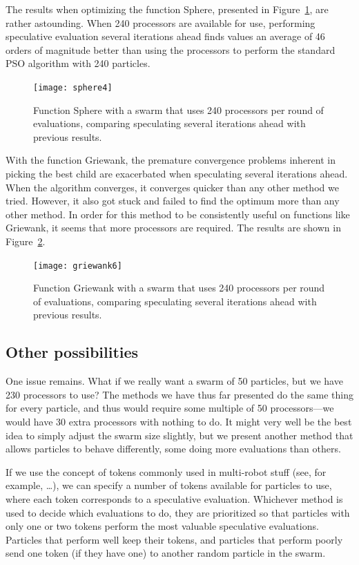\documentclass[journal,letterpaper]{IEEEtran}
\newcommand{\fig}[1]{Figure~\ref{fig:#1}}
\begin{document}
The results when optimizing the function Sphere, presented in
\fig{sphere-manyiters}, are rather astounding.  When 240 processors are
available for use, performing speculative evaluation several iterations ahead
finds values an average of 46 orders of magnitude better than using the
processors to perform the standard PSO algorithm with 240 particles.

\begin{figure}
  \centering
  \texttt{[image: sphere4]}
  \caption{Function Sphere with a swarm that uses 240 processors per round of
  evaluations, comparing speculating several iterations ahead with previous
  results.}
  \label{fig:sphere-manyiters}
\end{figure}

With the function Griewank, the premature convergence problems inherent in
picking the best child are exacerbated when speculating several iterations
ahead.  When the algorithm converges, it converges quicker than any other 
method we tried.  However, it also got stuck and failed to find the optimum
more than any other method.  In order for this method to be consistently useful
on functions like Griewank, it seems that more processors are required.  The
results are shown in \fig{griewank-manyiters}.

\begin{figure}
  \centering
  \texttt{[image: griewank6]}
  \caption{Function Griewank with a swarm that uses 240 processors per round of
  evaluations, comparing speculating several iterations ahead with previous
  results.}
  \label{fig:griewank-manyiters}
\end{figure}

\subsection{Other possibilities}
\label{sec:other}

One issue remains.  What if we really want a swarm of 50 particles, but we have
230 processors to use?  The methods we have thus far presented do the same
thing for every particle, and thus would require some multiple of 50
processors---we would have 30 extra processors with nothing to do.  It might
very well be the best idea to simply adjust the swarm size slightly, but we
present another method that allows particles to behave differently, some doing
more evaluations than others.

If we use the concept of tokens commonly used in multi-robot stuff (see, for
example, \dots), we can specify a number of tokens available for particles to
use, where each token corresponds to a speculative evaluation.  Whichever
method is used to decide which evaluations to do, they are prioritized so that
particles with only one or two tokens perform the most valuable speculative
evaluations.  Particles that perform well keep their tokens, and particles that
perform poorly send one token (if they have one) to another random particle in
the swarm.
\end{document}
